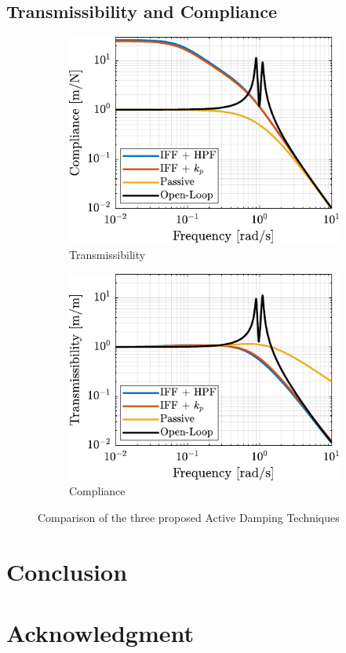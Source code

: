 \documentclass{ISMA_USD2020}
\begin{document}
\subsection{Transmissibility and Compliance}
\label{sec:org59b0db2}


\begin{figure}[htbp]
\begin{subfigure}[c]{0.45\linewidth}
\includegraphics[width=\linewidth]{figs/comp_compliance.pdf}
\caption{\label{fig:comp_compliance} Transmissibility}
\end{subfigure}
\begin{subfigure}[c]{0.45\linewidth}
\includegraphics[width=\linewidth]{figs/comp_transmissibility.pdf}
\caption{\label{fig:comp_transmissibility} Compliance}
\end{subfigure}
\caption{\label{fig:comp_active_damping}Comparison of the three proposed Active Damping Techniques}
\centering
\end{figure}

\section{Conclusion}
\label{sec:org4b70853}
\label{sec:conclusion}


\section*{Acknowledgment}
\label{sec:org7708a14}


\end{document}
